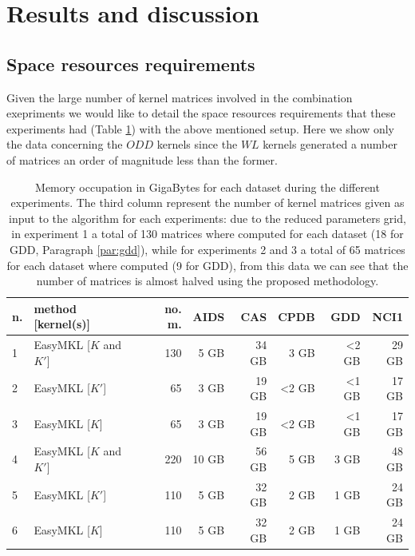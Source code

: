 
\section{Results and discussion}
\label{sec:results}

\subsection{Space resources requirements}
Given the large number of kernel matrices involved in the combination exepriments
we would like to detail the space resources requirements that these experiments
had (Table \ref{table:space}) with the above mentioned setup.
Here we show only the data concerning the $ODD$ kernels since the $WL$ kernels
generated a number of matrices an order of magnitude less than the former.

\begin{table}[ht]
    \centering\footnotesize
    \begin{tabular}{|l|l|r|r|r|r|r|r|}
        \hline
        n. & method [kernel(s)] & no. m. & AIDS & CAS & CPDB & GDD & NCI1 \\
        \hline
        1 & EasyMKL [$K$ and $K'$] & 130 & 5 GB & 34 GB & 3 GB & <2 GB & 29 GB \\
        \hline
        2 & EasyMKL [$K'$] & 65 & 3 GB & 19 GB & <2 GB & <1 GB & 17 GB \\
        \hline
        3 & EasyMKL [$K$] & 65 & 3 GB & 19 GB & <2 GB & <1 GB & 17 GB \\
        \hline
        4 & EasyMKL [$K$ and $K'$] & 220 & 10 GB & 56 GB & 5 GB & 3 GB & 48 GB \\
        \hline
        5 & EasyMKL [$K'$] & 110 & 5 GB & 32 GB & 2 GB & 1 GB & 24 GB \\
        \hline
        6 & EasyMKL [$K$] & 110 & 5 GB & 32 GB & 2 GB & 1 GB & 24 GB \\
        \hline
    \end{tabular}
    \caption{Memory occupation in GigaBytes for each dataset during the different
    experiments. The third column represent the number of kernel matrices given as
    input to the algorithm for each experiments: due to the reduced parameters grid,
    in experiment 1 a total of 130 matrices where computed for each dataset
    (18 for GDD, Paragraph \ref{par:gdd}), while for experiments 2 and 3 a total
    of 65 matrices for each dataset where computed (9 for GDD), from this data we
    can see that the number of matrices is almost halved using the proposed methodology.}
    \label{table:space}
\end{table}

